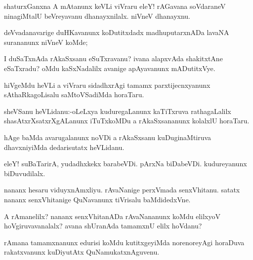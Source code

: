\documentclass{article}
\begin{document}
\begin{mn}%
shaturxGanxna A mAtanunx keVLi viVraru eleY! rAGavana soVdaraneV ninagiMtalU beVreyavanu 
dhanayxnilalx. niVneV dhanayxnu.
\end{mn}

\begin{mn}%
deVvadanavarige duHKavanunx koDutitxdadx madhuputarxnADa lavaNA surananunx niVneV koMde; 
\end{mn}

\begin{mn}%
I duSaTxnAda rAkaSxsanu eSuTxravanu? ivana alapxvAda shakitxtAne eSaTxradu? oMdu 
kaSxNadalilx avanige apAyavanunx mADutitxVye.
\end{mn}

\begin{mn}%
hiVgeMdu heVLi a viVraru sidadhxrAgi tamamx parxtijecnxyanunx sAthaRkagoLisalu 
saMtoVSadiMda horaTaru.
\end{mn}


\begin{mn}%
sheVSanu heVLidanu:-oLeLxya kuduregaLanunx kaTiTxruva rathagaLalilx shasAtxrXsatxrXgALanunx 
iTuTxkoMDu a rAkaSxsananunx kolalxlU horaTaru.
\end{mn}

\begin{mn}%
hAge baMda avarugalanunx noVDi a rAkaSxsanu kuDuginaMtiruva dhavxniyiMda dedarisutatx 
heVLidanu.
\end{mn}

\begin{mn}%
eleY! suBaTarirA, yudadhxkekx barabeVDi. pArxNa biDabeVDi. kudureyanunx biDuvudilalx.
\end{mn}

\begin{mn}%
nananx hesaru viduyxnAmxliyu. rAvaNanige perxVmada senxVhitanu. satatx nananx 
senxVhitanige QuNavanunx tiVrisalu baMdidedxVne.
\end{mn}

\begin{mn}%
A rAmanelilx? nananx senxVhitanADa rAvaNananunx koMdu elilxyoV hoVgiruvavanalalx? avana 
shUranAda tamamxnU elilx hoVdanu?
\end{mn}

\begin{mn}%
rAmana tamamxnanunx edurisi koMdu kutitxgeyiMda norenoreyAgi horaDuva rakatxvanunx 
kuDiyutAtx QuNamukatxnAguvenu.
\end{mn}
\end{document}
